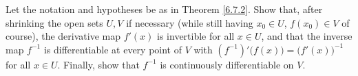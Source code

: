 \begin{exercise}\label{ex 6.7.4}
    Let the notation and hypotheses be as in Theorem \ref{6.7.2}.
    Show that, after shrinking the open sets \(U, V\) if necessary (while still having \(x_0 \in U\), \(f(x_0) \in V\) of course), the derivative map \(f'(x)\) is invertible for all \(x \in U\), and that the inverse map \(f^{-1}\) is differentiable at every point of \(V\) with \((f^{-1})' \big(f(x)\big) = \big(f'(x)\big)^{-1}\) for all \(x \in U\).
    Finally, show that \(f^{-1}\) is continuously differentiable on \(V\).
\end{exercise}